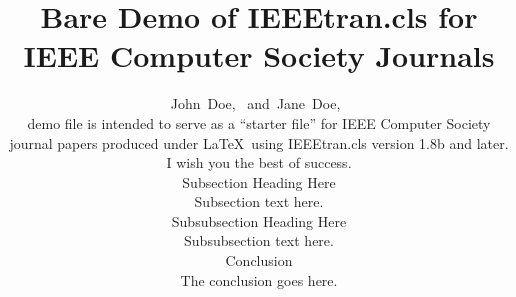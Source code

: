 \documentclass[10pt,journal,compsoc]{IEEEtran}
\begin{document}
\title{Bare Demo of IEEEtran.cls for\\ IEEE Computer Society Journals}
\author{John~Doe,~
        and~Jane~Doe,~%

%


\maketitle
\IEEEdisplaynontitleabstractindextext
\IEEEpeerreviewmaketitle


 demo file is intended to serve as a ``starter file''
for IEEE Computer Society journal papers produced under \LaTeX\ using
IEEEtran.cls version 1.8b and later.
I wish you the best of success.

\subsection{Subsection Heading Here}
Subsection text here.

\subsubsection{Subsubsection Heading Here}

Subsubsection text here.

\section{Conclusion}

The conclusion goes here.

}
\end{document}
